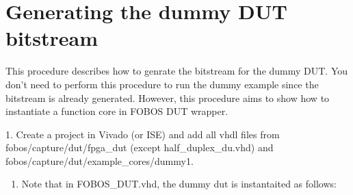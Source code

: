 \documentclass[letterpaper,10pt,english]{sphinxmanual}
\begin{document}
\begin{sphinxVerbatim}[commandchars=\\\{\}]
      
          
              
         
     
            
                       
                 

            

 
\end{sphinxVerbatim}


\section{Generating the dummy DUT bitstream}
\label{\detokenize{dutdev:generating-the-dummy-dut-bitstream}}
This procedure describes how to genrate the bitstream for the dummy DUT. You don’t need to perform
this procedure to run the dummy example since the bitstream is already generated.
However, this procedure aims to show how to instantiate a function core in FOBOS DUT wrapper.

1. Create a project in Vivado (or ISE) and add all vhdl files from fobos/capture/dut/fpga\_dut (except half\_duplex\_du.vhd)
and fobos/capture/dut/example\_cores/dummy1.
\begin{enumerate}
\def\theenumi{\arabic{enumi}}
\def\labelenumi{\theenumi .}
\makeatletter\def\p@enumii{\p@enumi \theenumi .}\makeatother
\setcounter{enumi}{1}
\item {} 
Note that in FOBOS\_DUT.vhd, the dummy dut is instantaited as follows:

\end{enumerate}
\end{document}
